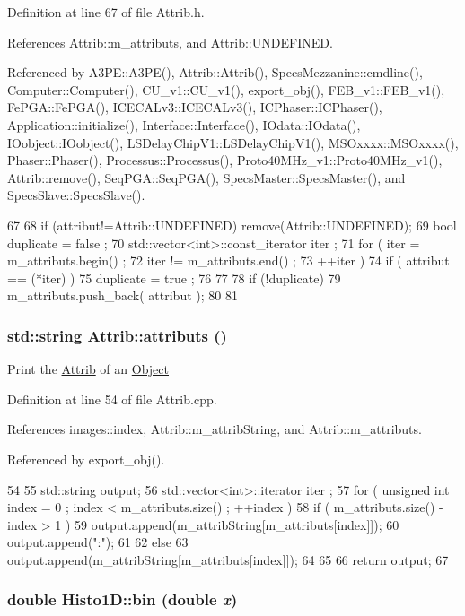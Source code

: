 Definition at line 67 of file Attrib.h.

References Attrib::m\_\-attributs, and Attrib::UNDEFINED.

Referenced by A3PE::A3PE(), Attrib::Attrib(), SpecsMezzanine::cmdline(), Computer::Computer(), CU\_\-v1::CU\_\-v1(), export\_\-obj(), FEB\_\-v1::FEB\_\-v1(), FePGA::FePGA(), ICECALv3::ICECALv3(), ICPhaser::ICPhaser(), Application::initialize(), Interface::Interface(), IOdata::IOdata(), IOobject::IOobject(), LSDelayChipV1::LSDelayChipV1(), MSOxxxx::MSOxxxx(), Phaser::Phaser(), Processus::Processus(), Proto40MHz\_\-v1::Proto40MHz\_\-v1(), Attrib::remove(), SeqPGA::SeqPGA(), SpecsMaster::SpecsMaster(), and SpecsSlave::SpecsSlave().


\begin{DoxyCode}
67                             {
68     if (attribut!=Attrib::UNDEFINED) remove(Attrib::UNDEFINED);
69     bool duplicate = false ;
70     std::vector<int>::const_iterator iter ;
71     for ( iter  = m_attributs.begin() ;
72           iter != m_attributs.end()   ;
73           ++iter ) {
74       if ( attribut == (*iter) ) {
75         duplicate = true ;
76       }
77     }
78     if (!duplicate) {
79       m_attributs.push_back( attribut );
80     }
81   }
\end{DoxyCode}
\hypertarget{classAttrib_aee7bbf16b144887f196e1341b24f8a26}{
\subsubsection[{attributs}]{\setlength{\rightskip}{0pt plus 5cm}std::string Attrib::attributs ()}}
\label{classAttrib_aee7bbf16b144887f196e1341b24f8a26}
Print the \hyperlink{classAttrib}{Attrib} of an \hyperlink{classObject}{Object} 

Definition at line 54 of file Attrib.cpp.

References images::index, Attrib::m\_\-attribString, and Attrib::m\_\-attributs.

Referenced by export\_\-obj().


\begin{DoxyCode}
54                             {
55   std::string output;
56   std::vector<int>::iterator iter ;
57   for ( unsigned int index = 0 ; index < m_attributs.size() ; ++index ) {
58     if ( m_attributs.size() - index > 1 ) {
59       output.append(m_attribString[m_attributs[index]]);
60       output.append(":");
61     }
62     else {
63       output.append(m_attribString[m_attributs[index]]);
64     }
65   }
66   return output;
67 }
\end{DoxyCode}
\hypertarget{classHisto1D_a2a8a7d93c2f10b73b490a6f550e00db4}{
\subsubsection[{bin}]{\setlength{\rightskip}{0pt plus 5cm}double Histo1D::bin (double {\em x})}}
\label{classHisto1D_a2a8a7d93c2f10b73b490a6f550e00db4}


